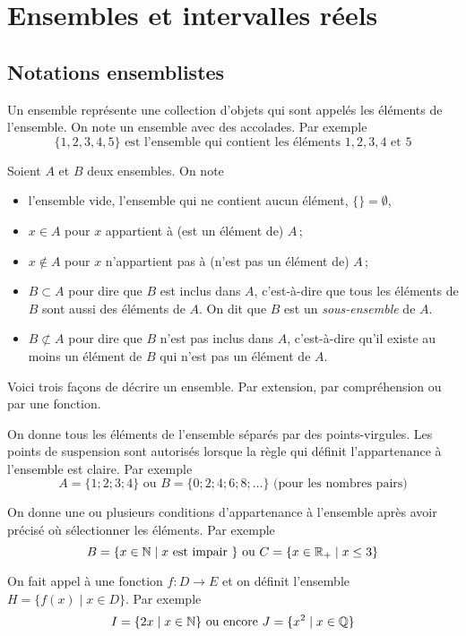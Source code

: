 \documentclass[a4paper,12pt]{report}
\begin{document}
\chapter{Ensembles et intervalles réels}
\thispagestyle{fancy}
\section{Notations ensemblistes}
Un ensemble représente une collection d'objets qui sont appelés les éléments de l'ensemble. On note un ensemble avec des accolades. 
Par exemple 
\[\{1,2,3,4,5\} \text{ est l'ensemble qui contient les éléments } 1,2,3,4 \text{ et } 5\]

\begin{notation}	
Soient $A$ et $B$ deux ensembles.
On note 
\begin{itemize}
\item[{\PencilRightDown}] l'ensemble vide, l'ensemble qui ne contient aucun élément, $\{\}=\emptyset$,\; 
 \item[{\PencilRightDown}] $x\in A$ pour $x$ appartient à (est un élément de) $A$\,;
 \item[{\PencilRightDown}] $x\not\in A$ pour $x$ n'appartient pas à (n'est pas un élément de) $A$\,;
	\item[{\PencilRightDown}] $B\subset A$ pour dire que $B$ est inclus dans $A$, c'est-à-dire que tous les éléments de $B$ sont aussi des éléments de $A$. On dit que $B$ est un \emph{sous-ensemble} de $A$.
	\item[{\PencilRightDown}] $B\not \subset A$ pour dire que $B$ n'est pas inclus dans $A$, c'est-à-dire qu'il existe au moins un élément de $B$ qui n'est pas un élément de $A$.  
\end{itemize}
\end{notation}

Voici trois façons de décrire un ensemble.
Par extension, par compréhension ou par une fonction. 

\begin{description}[leftmargin=2cm]
	\item[\emph{Par extension}] On donne tous les éléments de l'ensemble séparés par des points-virgules.
		Les points de suspension sont autorisés lorsque la règle qui définit l'appartenance à l'ensemble est claire. 
		Par exemple 
		\[A=\{1;2;3;4\} \text{ ou } B=\{0;2;4;6;8;\ldots\}\text{ (pour les nombres pairs)}\]
	\item[\emph{Par compréhension}] On donne une ou plusieurs conditions d'appartenance à l'ensemble après avoir précisé où sélectionner les éléments.
		Par exemple
		\[B=\{x\in \mathbb N \mid x \text{ est impair }\} \text{ ou } C=\{x\in \mathbb R_{+}\mid x\leq 3\} \]
	\item[\emph{Par une fonction}] On fait appel à une fonction $f:D\rightarrow E$ et on définit l'ensemble $H=\{f(x) \mid x\in D\}$. 
		Par exemple
		\[I=\{2x\mid x\in \mathbb N\} \text{ ou encore } J=\{x^2\mid x\in \mathbb Q\}\]
\end{description}
\end{document}
